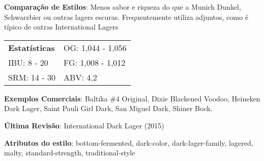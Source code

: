 \textbf{Comparação de Estilos}: Menos sabor e riqueza do que a Munich Dunkel, Schwarzbier ou outras lagers escuras. Frequentemente utiliza adjuntos, como é típico de outras International Lagers

\begin{tabular}{@{}p{35mm}p{35mm}@{}}
  \textbf{Estatísticas} & OG: 1,044 - 1,056 \\
  IBU: 8 - 20 & FG: 1,008 - 1,012 \\
  SRM: 14 - 30 & ABV: 4,2%
  \end{tabular}

\textbf{Exemplos Comerciais}: Baltika \#4 Original, Dixie Blackened Voodoo, Heineken Dark Lager, Saint Pauli Girl Dark, San Miguel Dark, Shiner Bock.

\textbf{Última Revisão}: International Dark Lager (2015)

\textbf{Atributos do estilo}: bottom-fermented, dark-color, dark-lager-family, lagered, malty, standard-strength, traditional-style

